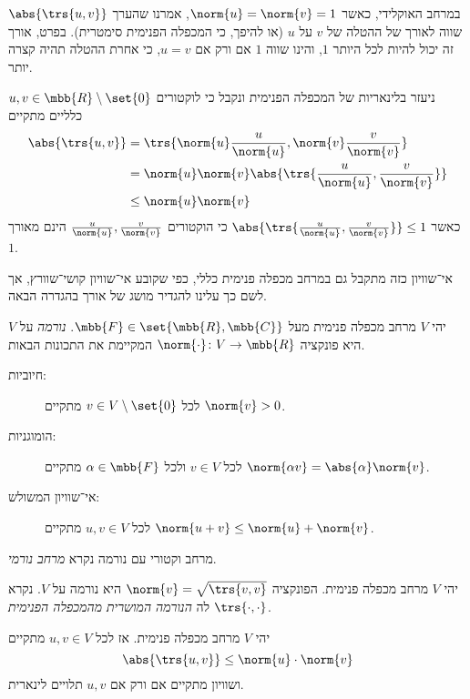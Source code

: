 \documentclass[a4paper,10pt,twoside,openany]{book}
\begin{document}
במרחב האוקלידי, כאשר
$\norm{u} = \norm{v} = 1$,
אמרנו שהערך
$\abs{\trs{u,v}}$
שווה לאורך של ההטלה של
$v$
על
$u$
(או להיפך, כי המכפלה הפנימית סימטרית).
בפרט, אורך זה יכול להיות לכל היותר
$1$,
והינו שווה
$1$
אם ורק אם
$u = v$,
כי אחרת ההטלה תהיה קצרה יותר.

ניעזר בלינאריות של המכפלה הפנימית ונקבל כי לוקטורים
$u,v \in \mbb{R} \setminus \set{0}$
כלליים מתקיים
\begin{align*}
\abs{\trs{u,v}} &= \trs{\norm{u} \frac{u}{\norm{u}}, \norm{v} \frac{v}{\norm{v}}}
\\&=
\norm{u} \norm{v} \abs{\trs{\frac{u}{\norm{u}}, \frac{v}{\norm{v}}}}
\\&\leq \norm{u} \norm{v}
\end{align*}
כאשר
$\abs{\trs{\frac{u}{\norm{u}}, \frac{v}{\norm{v}}}} \leq 1$
כי הוקטורים
$\frac{u}{\norm{u}}, \frac{v}{\norm{v}}$
הינם מאורך
$1$.

אי־שוויון כזה מתקבל גם במרחב מכפלה פנימית כללי, כפי שקובע אי־שוויון קושי־שוורץ, אך לשם כך עלינו להגדיר מושג של אורך בהגדרה הבאה.

\begin{definition}[נורמה]
יהי
$V$
מרחב מכפלה פנימית מעל
$\mbb{F} \in \set{\mbb{R}, \mbb{C}}$.
\emph{נורמה}
על
$V$
היא פונקציה
$\norm{\cdot} \colon V \to \mbb{R}$
המקיימת את התכונות הבאות.

\begin{description}
\item[חיוביות:]
לכל
$v \in V \setminus \set{0}$
מתקיים
$\norm{v} > 0$.

\item[הומוגניות:]
לכל
$v \in V$
ולכל
$\alpha \in \mbb{F}$
מתקיים
$\norm{\alpha v} = \abs{\alpha} \norm{v}$.

\item[אי־שוויון המשולש:]
לכל
$u,v \in V$
מתקיים
$\norm{u+v} \leq \norm{u} + \norm{v}$.
\end{description}

מרחב וקטורי עם נורמה נקרא
\emph{מרחב נורמי}.
\end{definition}

\begin{theorem}
יהי
$V$
מרחב מכפלה פנימית.
הפונקציה
$\norm{v} = \sqrt{\trs{v,v}}$
היא נורמה על
$V$.
נקרא לה
\emph{הנורמה המושרית מהמכפלה הפנימית
$\trs{\cdot,\cdot}$}.
\end{theorem}

\begin{theorem}
יהי
$V$
מרחב מכפלה פנימית. אז לכל
$u,v \in V$
מתקיים
\[\abs{\trs{u,v}} \leq \norm{u} \cdot \norm{v}\]
ושוויון מתקיים אם ורק אם
$u,v$
תלויים לינארית.
\end{theorem}
\end{document}
